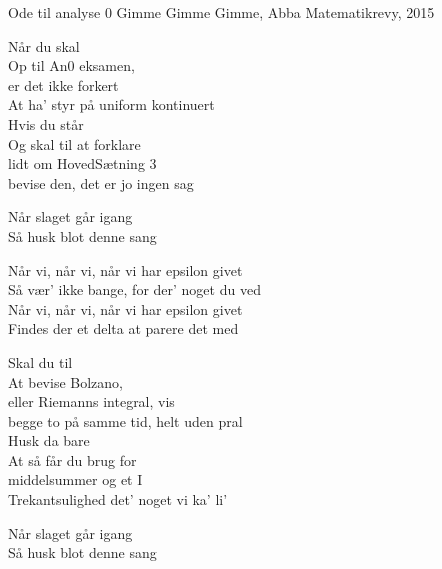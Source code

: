 \begin{song}{Ode til analyse 0}
  {} %
  {Gimme Gimme Gimme, Abba} %
  {} %
  {Matematikrevy, 2015} %
  {\NotCCLIed} %

  \begin{SBVerse}
    Når du skal\\
    Op til An0 eksamen,\\
    er det ikke forkert\\
    At ha' styr på uniform kontinuert \\
    Hvis du står\\
    Og skal til at forklare\\
    lidt om HovedSætning 3\\
    bevise den, det er jo ingen sag
  \end{SBVerse}

  \begin{SBSection*}
    Når slaget går igang\\
    Så husk blot denne sang
  \end{SBSection*}

  \begin{SBChorus}
    Når vi, når vi, når vi har epsilon givet\\
    Så vær' ikke bange, for der' noget du ved\\
    Når vi, når vi, når vi har epsilon givet\\
    Findes der et delta at parere det med
  \end{SBChorus}

  \begin{SBVerse}
    Skal du til\\
    At bevise Bolzano,\\
    eller Riemanns integral, vis\\
    begge to på samme tid, helt uden pral\\
    Husk da bare\\
    At så får du brug for\\
    middelsummer og et I\\
    Trekantsulighed det' noget vi ka' li'
  \end{SBVerse}

  \begin{SBSection*}
    Når slaget går igang\\
    Så husk blot denne sang
  \end{SBSection*}


\end{song}

